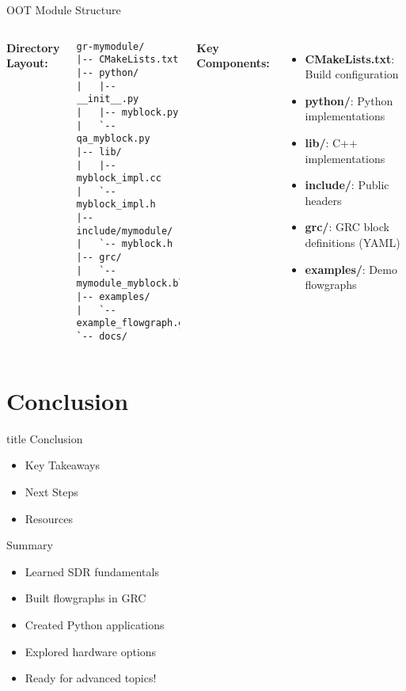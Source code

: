 \documentclass[aspectratio=169,11pt]{beamer}
\begin{document}
\begin{frame}[fragile]{OOT Module Structure}
\footnotesize
\begin{columns}[T]
\textbf{Directory Layout:}
\begin{verbatim}
gr-mymodule/
|-- CMakeLists.txt
|-- python/
|   |-- __init__.py
|   |-- myblock.py
|   `-- qa_myblock.py
|-- lib/
|   |-- myblock_impl.cc
|   `-- myblock_impl.h
|-- include/mymodule/
|   `-- myblock.h
|-- grc/
|   `-- mymodule_myblock.block.yml
|-- examples/
|   `-- example_flowgraph.grc
`-- docs/
\end{verbatim}

\textbf{Key Components:}
\begin{itemize}
    \item \textbf{CMakeLists.txt}: Build configuration
    \item \textbf{python/}: Python implementations
    \item \textbf{lib/}: C++ implementations
    \item \textbf{include/}: Public headers
    \item \textbf{grc/}: GRC block definitions (YAML)
    \item \textbf{examples/}: Demo flowgraphs
\end{itemize}

\end{columns}
\end{frame}

\section{Conclusion}

\begin{frame}[plain]
\vfill
\centering
\begin{beamercolorbox}[sep=8pt,center,shadow=true,rounded=true]{title}
\Large Conclusion\par
\end{beamercolorbox}
\vfill
\begin{itemize}
    \item Key Takeaways
    \item Next Steps
    \item Resources
\end{itemize}
\vfill
\end{frame}

\begin{frame}{Summary}
\begin{itemize}
    \item Learned SDR fundamentals
    \item Built flowgraphs in GRC
    \item Created Python applications
    \item Explored hardware options
    \item Ready for advanced topics!
\end{itemize}
\end{frame}
\end{document}
